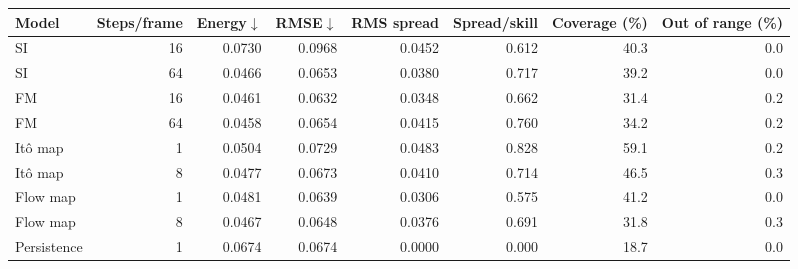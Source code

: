 \begin{tabular}{lrrrrrrr}
\toprule
Model & Steps/frame & Energy$\downarrow$ & RMSE$\downarrow$ & RMS spread & Spread/skill & Coverage (\%) & Out of range (\%) \\
\midrule
SI & 16 & 0.0730 & 0.0968 & 0.0452 & 0.612 & 40.3 & 0.0 \\
SI & 64 & 0.0466 & 0.0653 & 0.0380 & 0.717 & 39.2 & 0.0 \\
FM & 16 & 0.0461 & 0.0632 & 0.0348 & 0.662 & 31.4 & 0.2 \\
FM & 64 & 0.0458 & 0.0654 & 0.0415 & 0.760 & 34.2 & 0.2 \\
It\^o map & 1 & 0.0504 & 0.0729 & 0.0483 & 0.828 & 59.1 & 0.2 \\
It\^o map & 8 & 0.0477 & 0.0673 & 0.0410 & 0.714 & 46.5 & 0.3 \\
Flow map & 1 & 0.0481 & 0.0639 & 0.0306 & 0.575 & 41.2 & 0.0 \\
Flow map & 8 & 0.0467 & 0.0648 & 0.0376 & 0.691 & 31.8 & 0.3 \\
Persistence & 1 & 0.0674 & 0.0674 & 0.0000 & 0.000 & 18.7 & 0.0 \\
\bottomrule
\end{tabular}
